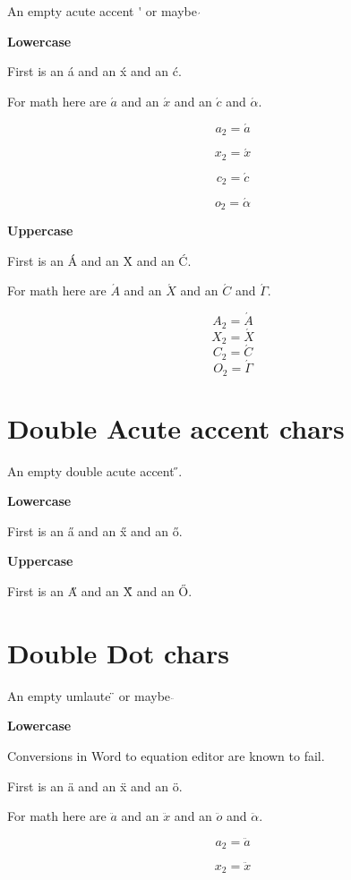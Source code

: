 \documentclass{article}
\begin{document}
An empty acute accent \'{} or maybe $\acute{}$

\textbf{Lowercase}

First is an \'{a} and an \'{x} and an \'{c}.

For math here are $\acute{a}$ and an $\acute{x}$ and an $\acute{c}$ and $\acute{\alpha}$.

$$a_2=\acute{a}$$

$$x_2=\acute{x}$$

$$c_2=\acute{c}$$

$$o_2=\acute{\alpha}$$

\textbf{Uppercase}

First is an \'{A} and an \'{X} and an \'{C}.

For math here are $\acute{A}$ and an $\acute{X}$ and an $\acute{C}$ and $\acute{\Gamma}$.

$$A_2=\acute{A}$$
$$X_2=\acute{X}$$
$$C_2=\acute{C}$$
$$O_2=\acute{\Gamma}$$




\section{Double Acute accent chars}

An empty double acute accent \H{}.

\textbf{Lowercase}

First is an \H{a} and an \H{x} and an \H{o}.

\textbf{Uppercase}

First is an \H{A} and an \H{X} and an \H{O}.




\section{Double Dot chars}

An empty umlaute \"{} or maybe $\ddot{}$

\textbf{Lowercase}

Conversions in Word to equation editor are known to fail. 

First is an \"{a} and an \"{x} and an \"{o}.

For math here are $\ddot{a}$ and an $\ddot{x}$ and an $\ddot{o}$ and $\ddot{\alpha}$.

$$a_2=\ddot{a}$$

$$x_2=\ddot{x}$$
\end{document}
